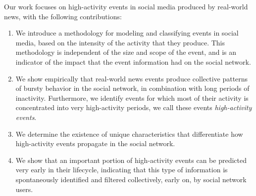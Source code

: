 


Our work focuses on high-activity events in social media produced by real-world
news, with the following contributions:
\begin{enumerate}

\item We introduce a methodology for modeling and classifying events in social
media, based on the intensity of the activity that they produce. 
%
This methodology is independent of the size and scope of the event, and is an
indicator of the impact that the event information had on the social network.

\item We show empirically that real-world news events produce collective
patterns of bursty behavior in the social network, in combination with long periods of
inactivity. 
%
Furthermore, we identify events for which most of their activity is concentrated
into very high-activity periods, we call these events {\em high-activity
events}.

\item We determine the existence of unique characteristics that differentiate
how high-activity events propagate in the social network.

\item We show that an important portion of high-activity events can be predicted
very early in their lifecycle, indicating that this type of information is
spontaneously identified and filtered collectively, early on, by social network
users.

\end{enumerate}

